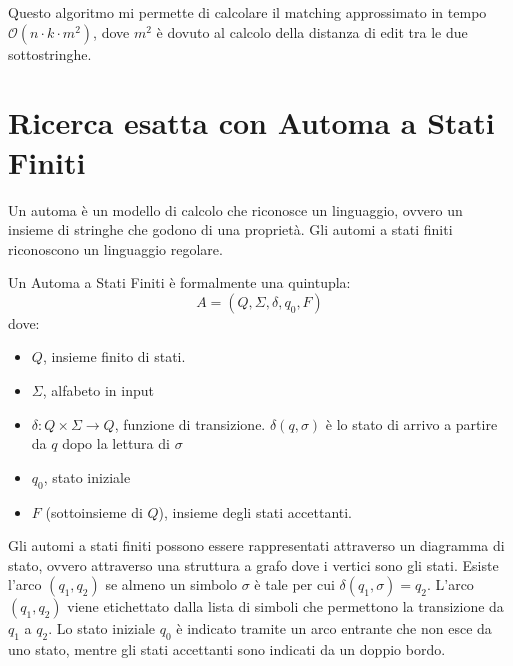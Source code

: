 Questo algoritmo mi permette di calcolare il matching approssimato in tempo
$\mathcal{O}(n \cdot k \cdot m^2)$, dove $m^2$ è dovuto al calcolo della distanza
di edit tra le due sottostringhe.
\section{Ricerca esatta con Automa a Stati Finiti}
Un automa è un modello di calcolo che riconosce un linguaggio, ovvero un insieme
di stringhe che godono di una proprietà. Gli automi a stati finiti riconoscono un linguaggio regolare.
\begin{definizione} 
    Un Automa a Stati Finiti è formalmente una quintupla:
    \begin{equation}
        A = (Q, \Sigma, \delta, q_0, F)
    \end{equation}
    dove:
    \begin{itemize}
        \item $Q$, insieme finito di stati.
        \item $\Sigma$, alfabeto in input
        \item $\delta: Q \times \Sigma \to Q$, funzione di transizione.
              $\delta(q,\sigma)$ è lo stato di arrivo a partire da $q$ dopo la lettura
              di $\sigma$
        \item $q_0$, stato iniziale
        \item $F$ (sottoinsieme di $Q$), insieme degli stati accettanti.
    \end{itemize}
\end{definizione}
Gli automi a stati finiti possono essere rappresentati attraverso un diagramma di
stato, ovvero attraverso una struttura a grafo dove i vertici sono gli stati.
Esiste l'arco $(q_1,q_2)$ se almeno un simbolo $\sigma$ è tale per cui $\delta(q_1,\sigma) = q_2$.
L'arco $(q_1,q_2)$ viene etichettato dalla lista di simboli che permettono la
transizione da $q_1$ a $q_2$. Lo stato iniziale $q_0$ è indicato tramite un arco
entrante che non esce da uno stato, mentre gli stati accettanti sono indicati da un doppio bordo.

